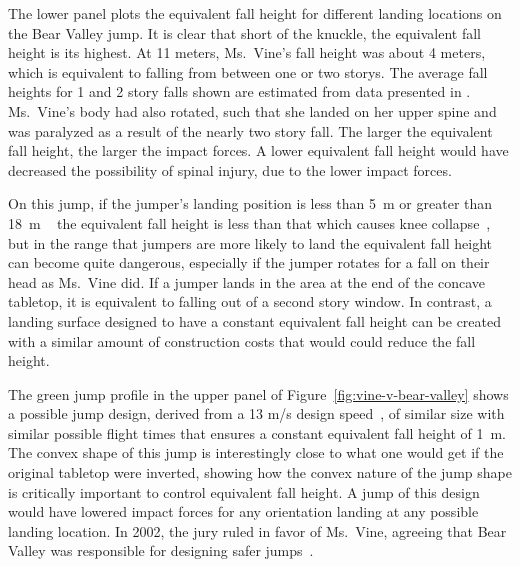 \documentclass{article}
\begin{document}
The lower panel plots the equivalent fall height for different landing
locations on the Bear Valley jump. It is clear that short of the knuckle, the
equivalent fall height is its highest. At 11 meters, Ms.~Vine's fall height was
about 4 meters, which is equivalent to falling from between one or two storys.
The average fall heights for 1 and 2 story falls shown are estimated from data
presented in \cite{Vish2005}. ~ Ms.~Vine's body had also rotated, such that she
landed on her upper spine and was paralyzed as a result of the nearly two
story fall. The larger the equivalent fall height, the larger the impact
forces. A lower equivalent fall height would have decreased the possibility of
spinal injury, due to the lower impact forces.

On this jump, if the jumper's landing position is less than 5~\si{\meter} or
greater than 18~\si{\meter} ~ the equivalent fall height is less than that which
causes knee collapse~\cite{Minetti1998}, but in the range that jumpers are more
likely to land the equivalent fall height can become quite dangerous,
especially if the jumper rotates for a fall on their head as Ms.~Vine did. If a
jumper lands in the area at the end of the concave tabletop, it is equivalent
to falling out of a second story window. In contrast, a landing surface
designed to have a constant equivalent fall height can be created with a
similar amount of construction costs that would could reduce the fall height.

The green jump profile in the upper panel of
Figure~\ref{fig:vine-v-bear-valley} shows a possible jump design, derived from
a 13 m/s design speed~\cite{Levy2015}, of similar size with similar possible
flight times that ensures a constant equivalent fall height of 1~\si{\meter}.
The convex shape of this jump is interestingly close to what one would get if
the original tabletop were inverted, showing how the convex nature of the jump
shape is critically important to control equivalent fall height. A jump of this
design would have lowered impact forces for any orientation landing at any
possible landing location. In 2002, the jury ruled in favor of Ms.~Vine,
agreeing that Bear Valley was responsible for designing safer
jumps~\cite{Alvarado2002}.
\end{document}
